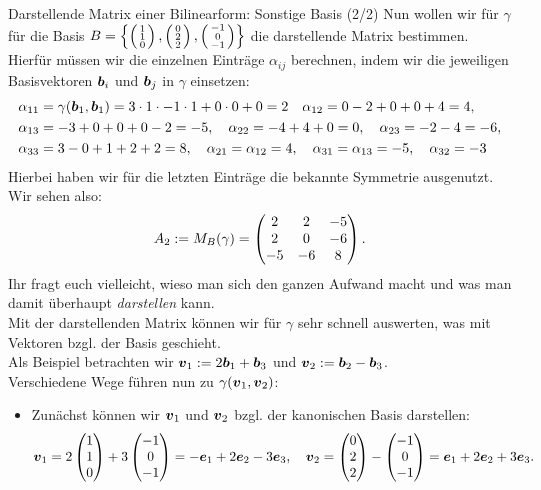 \begin{Beispiel}
{Darstellende Matrix einer Bilinearform: Sonstige Basis (2/2)}
Nun wollen wir für $\gamma$ für die Basis $B=\left\{\left(\begin{smallmatrix}1\\1\\0\end{smallmatrix}\right),\left(\begin{smallmatrix}0\\2\\2\end{smallmatrix}\right),\left(\begin{smallmatrix}-1\\0\\-1\end{smallmatrix}\right)\right\}$ die darstellende Matrix bestimmen.\\
Hierfür müssen wir die einzelnen Einträge $\alpha_{ij}$ berechnen, indem wir die jeweiligen Basisvektoren ${{\text{\boldmath${b}$}}}_i$ und ${{\text{\boldmath${b}$}}}_j$ in $\gamma$ einsetzen:
\begin{align*}
    \alpha_{11}&=\gamma({{\text{\boldmath${b}$}}}_1,{{\text{\boldmath${b}$}}}_1)=3\cdot 1\cdot -1\cdot 1+0\cdot 0+0=2\quad \alpha_{12}=0-2+0+0+4=4,\\
    \alpha_{13}&=-3+0+0+0-2=-5,\quad \alpha_{22}=-4+4+0=0,\quad \alpha_{23}=-2-4=-6,\\
    \alpha_{33}&=3-0+1+2+2=8,\quad \alpha_{21}=\alpha_{12}=4,\quad \alpha_{31}=\alpha_{13}=-5,\quad\alpha_{32}=-3
\end{align*}
Hierbei haben wir für die letzten Einträge die bekannte Symmetrie ausgenutzt. Wir sehen also:
\begin{equation*}
    A_2:=M_B(\gamma)=\begin{pmatrix}2&2&-5\\2&0&-6\\-5&-6&8\end{pmatrix}.
\end{equation*}
Ihr fragt euch vielleicht, wieso man sich den ganzen Aufwand macht und was man damit überhaupt \textit{darstellen} kann.\\
Mit der darstellenden Matrix können wir für $\gamma$ sehr schnell auswerten, was mit Vektoren bzgl. der Basis geschieht.\\
Als Beispiel betrachten wir ${{\text{\boldmath${v}$}}}_1:=2{{\text{\boldmath${b}$}}}_1+{{\text{\boldmath${b}$}}}_3$ und ${{\text{\boldmath${v}$}}}_2:={{\text{\boldmath${b}$}}}_2-{{\text{\boldmath${b}$}}}_3$.\\
Verschiedene Wege führen nun zu $\gamma({{\text{\boldmath${v}$}}}_1,{{\text{\boldmath${v}$}}}_2)$:
\begin{itemize}
    \item Zunächst können wir ${{\text{\boldmath${v}$}}}_1$ und ${{\text{\boldmath${v}$}}}_2$ bzgl. der kanonischen Basis darstellen:
    \begin{equation*}
        \vvec_1=2\Matrix{1\\1\\0}+3\Matrix{-1\\0\\-1}=-\evec_1+2\evec_2-3\evec_3,\quad \vvec_2=\Matrix{0\\2\\2}-\Matrix{-1\\0\\-1}=\evec_1+2\evec_2+3\evec_3.

\end{equation*}
\end{itemize}
\end{Beispiel}

